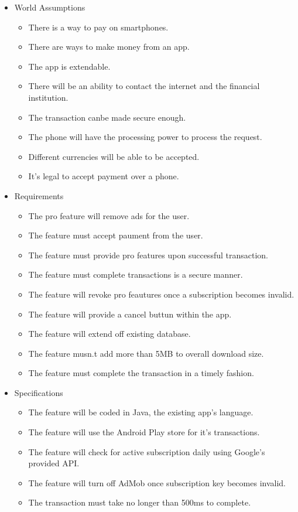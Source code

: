     \begin{itemize}
        \item World Assumptions
        \begin{itemize}
            \item There is a way to pay on smartphones.
            \item There are ways to make money from an app.
            \item The app is extendable.
            \item There will be an ability to contact the internet and the financial institution.
            \item The transaction canbe made secure enough.
            \item The phone will have the processing power to process the request.
            \item Different currencies will be able to be accepted.
            \item It's legal to accept payment over a phone.
        \end{itemize}
        \item Requirements
        \begin{itemize}
            \item The pro feature will remove ads for the user.
            \item The feature must accept paument from the user.
            \item The feature must provide pro features upon successful transaction.
            \item The feature must complete transactions is a secure manner.
            \item The feature will revoke pro feautures once a subscription becomes invalid.
            \item The feature will provide a cancel buttun within the app.
            \item The feature will extend off existing database.
            \item The feature musn.t add more than 5MB to overall download size.
            \item The feature must complete the transaction in a timely fashion.
        \end{itemize}
        \item Specifications
        \begin{itemize}
            \item The feature will be coded in Java, the existing app's language.
            \item The feature will use the Android Play store for it's transactions.
            \item The feature will check for active subscription daily using Google's provided API.
            \item The feature will turn off AdMob once subscription key becomes invalid.
            \item The transaction must take no longer than 500ms to complete.
        \end{itemize}
    \end{itemize}
